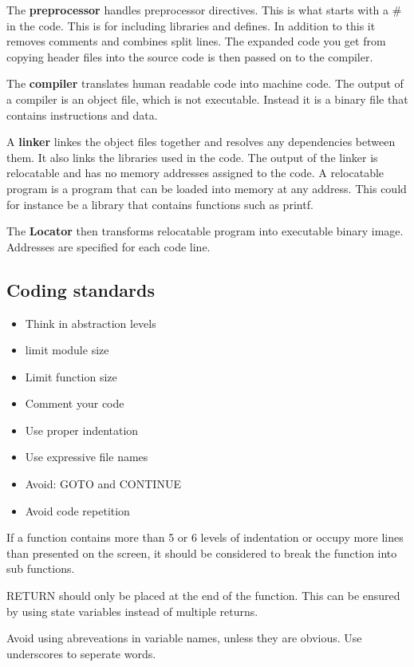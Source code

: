 The \textbf{preprocessor} handles preprocessor directives. This is what
starts with a \# in the code. This is for including libraries
and defines. In addition to this it removes comments and combines
split lines. The expanded code you get from copying header files
into the source code is then passed on to the compiler.

The \textbf{compiler} translates human readable code into machine code.
The output of a compiler is an object file, which is not executable.
Instead it is a binary file that contains instructions and data.

A \textbf{linker} linkes the object files together and resolves
any dependencies between them. It also links the libraries used
in the code. The output of the linker is relocatable and has no memory
addresses assigned to the code.
A relocatable program is a program that can be loaded into memory
at any address.
This could for instance be a library that contains functions such
as printf.



The \textbf{Locator} then transforms relocatable program into executable
binary image. Addresses are specified for each code line.


\subsection{Coding standards}
\begin{itemize}
	\item Think in abstraction levels
	\item limit module size
	\item Limit function size
	\item Comment your code
	\item Use proper indentation
	\item Use expressive file names
	\item Avoid: GOTO and CONTINUE
	\item Avoid code repetition
\end{itemize}

If a function contains more than 5 or 6 levels of indentation
or occupy more lines than presented on the screen, it should
be considered to break the function into sub functions.


RETURN should only be placed at the end of the function.
This can be ensured by using state variables instead of multiple
returns.

Avoid using abreveations in variable names, unless they are obvious.
Use underscores to seperate words.


